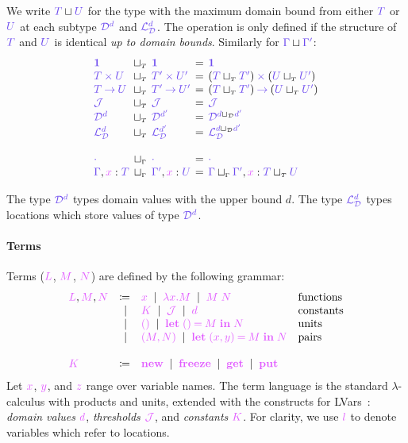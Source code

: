\documentclass[main.tex]{subfiles}
\begin{document}
We write $\ty{T}\sqcup\ty{U}$ for the type with the maximum domain bound from either $\ty{T}$ or $\ty{U}$ at each subtype $\tyD{d}$ and $\tyL{d}$. The operation is only defined if the structure of $\ty{T}$ and $\ty{U}$ is identical \emph{up to domain bounds}. Similarly for $\ty{\Gamma}\sqcup\ty{\Gamma'}$:
\[
  \setlength{\arraycolsep}{2pt}
  \begin{array}{lclcl}
    \ty{\tyunit} & \sqcupT & \ty{\tyunit}
    & = & \ty{\tyunit}
    \\
    \ty{\typrod{T}{U}} & \sqcupT & \ty{\typrod{T'}{U'}}
    & = & \typrod{(\ty{T}\sqcupT\ty{T'})}{(\ty{U}\sqcupT\ty{U'})}
    \\
    \ty{\tyfun{T}{U}} & \sqcupT & \ty{\tyfun{T'}{U'}}
    & = & \tyfun{(\ty{T}\sqcupT\ty{T'})}{(\ty{U}\sqcupT\ty{U'})}
    \\
    \tyJ & \sqcupT & \tyJ
    & = & \tyJ
    \\
    \tyD{d} & \sqcupT & \tyD{d'}
    & = & \tyD{{d}\sqcupD{d'}}
    \\
    \tyL{d} & \sqcupT & \tyL{d'}
    & = & \tyL{{d}\sqcupD{d'}}
    \\
    \\
    \ty{\emptyenv} & \sqcupG & \ty{\emptyenv}
    & = & \ty{\emptyenv}
    \\
    \ty{\Gamma},\tmty{x}{T} & \sqcupG & \ty{\Gamma'},\tmty{x}{U}
    & = & \ty{\Gamma}\sqcupG\ty{\Gamma'},\tm{x}:{\ty{T}\sqcupT\ty{U}}
  \end{array}
\]

The type $\tyD{d}$ types domain values with the upper bound $d$. The type $\tyL{d}$ types locations which store values of type $\tyD{d}$.

\paragraph*{Terms}
Terms ($\tm{L}$, $\tm{M}$, $\tm{N}$) are defined by the following grammar:
\[
  \begin{array}{lrll}
  \tm{L}, \tm{M}, \tm{N}
  & \coloneqq & \tm{x}
    \sep        \tm{\lambda x.M}
    \sep        \tm{M\;N}                     & \text{functions} \\
  & \sep      & \tm{K}                        
    \sep        \tmJ
    \sep        \tm{d}                        & \text{constants} \\
  & \sep      & \tm{\unit}                    
    \sep        \tm{\letunit{M}{N}}           & \text{units} \\
  & \sep      & \tm{\pair{M}{N}}              
    \sep        \tm{\letpair{x}{y}{M}{N}}     & \text{pairs}
  \\
  \\
  \tm{K}
  & \coloneqq & \tm{\lvarnew}
    \sep        \tm{\lvarfreeze}
    \sep        \tm{\lvarget}
    \sep        \tm{\lvarput}
\end{array}
\]
Let $\tm{x}$, $\tm{y}$, and $\tm{z}$ range over variable names. The term language is the standard $\lambda$-calculus with products and units, extended with the constructs for LVars~\citep{kuper15}: \emph{domain values} $\tm{d}$, \emph{thresholds} $\tmJ$, and \emph{constants} $\tm{K}$. For clarity, we use $\tm{l}$ to denote variables which refer to locations. 
\end{document}
